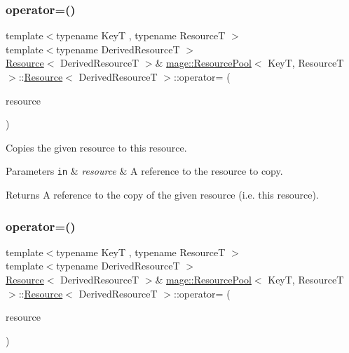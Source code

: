\subsubsection{\texorpdfstring{operator=()}{operator=()}\hspace{0.1cm}{\footnotesize\ttfamily [1/2]}}
{\footnotesize\ttfamily template$<$typename KeyT , typename ResourceT $>$ \\
template$<$typename Derived\+ResourceT $>$ \\
\hyperlink{structmage_1_1_resource_pool_1_1_resource}{Resource}$<$ Derived\+ResourceT $>$\& \hyperlink{classmage_1_1_resource_pool}{mage\+::\+Resource\+Pool}$<$ KeyT, ResourceT $>$\+::\hyperlink{structmage_1_1_resource_pool_1_1_resource}{Resource}$<$ Derived\+ResourceT $>$\+::operator= (\begin{DoxyParamCaption}\item[{const \hyperlink{structmage_1_1_resource_pool_1_1_resource}{Resource}$<$ Derived\+ResourceT $>$ \&}]{resource }\end{DoxyParamCaption})\hspace{0.3cm}{\ttfamily [delete]}}

Copies the given resource to this resource.


\begin{DoxyParams}[1]{Parameters}
\mbox{\tt in}  & {\em resource} & A reference to the resource to copy. \\
\hline
\end{DoxyParams}
\begin{DoxyReturn}{Returns}
A reference to the copy of the given resource (i.\+e. this resource). 
\end{DoxyReturn}
\hypertarget{structmage_1_1_resource_pool_1_1_resource_a7c280a7e0fd29d7a1fc2f5f0cf51737b}{}\label{structmage_1_1_resource_pool_1_1_resource_a7c280a7e0fd29d7a1fc2f5f0cf51737b} 
\subsubsection{\texorpdfstring{operator=()}{operator=()}\hspace{0.1cm}{\footnotesize\ttfamily [2/2]}}
{\footnotesize\ttfamily template$<$typename KeyT , typename ResourceT $>$ \\
template$<$typename Derived\+ResourceT $>$ \\
\hyperlink{structmage_1_1_resource_pool_1_1_resource}{Resource}$<$ Derived\+ResourceT $>$\& \hyperlink{classmage_1_1_resource_pool}{mage\+::\+Resource\+Pool}$<$ KeyT, ResourceT $>$\+::\hyperlink{structmage_1_1_resource_pool_1_1_resource}{Resource}$<$ Derived\+ResourceT $>$\+::operator= (\begin{DoxyParamCaption}\item[{\hyperlink{structmage_1_1_resource_pool_1_1_resource}{Resource}$<$ Derived\+ResourceT $>$ \&\&}]{resource }\end{DoxyParamCaption})\hspace{0.3cm}{\ttfamily [delete]}}

